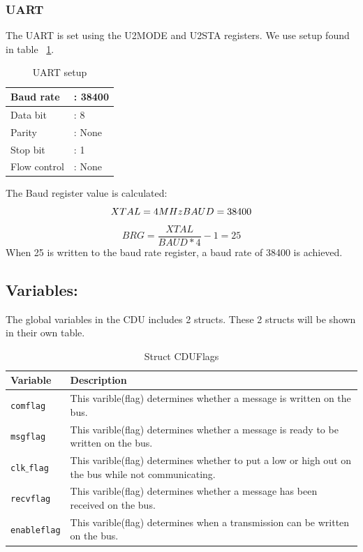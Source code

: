 \subsubsection{UART}
The UART is set using the U2MODE and U2STA registers. We use setup found in table ~\ref{fig:uartsetp}.\\
\begin{table}[H]
	\centering
    \begin{tabular}{|l l|}
    \hline
    Baud rate    & : 38400 \\ \hline
    Data bit     & : 8    \\ \hline
    Parity       & : None \\ \hline
    Stop bit     & : 1    \\ \hline
    Flow control & : None \\ \hline
    \end{tabular}
    \caption{UART setup}
    \label{fig:uartsetp}
\end{table}
The Baud register value is calculated:\\
\begin{equation}
XTAL = 4 MHz $\\$ 
BAUD = 38400 
\end{equation}
\begin{equation}
BRG = \frac{XTAL}{BAUD*4} - 1 = 25
\end{equation}
When 25 is written to the baud rate register, a baud rate of 38400 is achieved.

\subsection{Variables:}
The global variables in the CDU includes 2 structs. These 2 structs will be shown in their own table.
\begin{table}[H]
\centering
\begin{tabular}{|l|p{10cm}|}
\hline
\cellcolor[gray]{0.8}\textbf{Variable} &\cellcolor[gray]{0.8} \textbf{Description}\\ \hline
\texttt{comflag} & This varible(flag) determines whether a message is written on the bus.\\ 
\hline
\texttt{msgflag} & This varible(flag) determines whether a message is ready to be written on the bus.\\ 
\hline
\texttt{clk$\_$flag} & This varible(flag) determines whether to put a low or high out on the bus while not communicating.\\ 
\hline
\texttt{recvflag} & This varible(flag) determines whether a message has been received on the bus.\\ 
\hline
\texttt{enableflag} & This varible(flag) determines when a transmission can be written on the bus.\\ 
\hline
\end{tabular}
\caption{Struct CDUFlags}
\label{tab:structcduflags}
\end{table}

